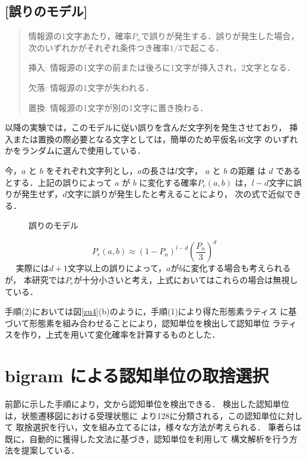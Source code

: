 \subsection*{[誤りのモデル]}
\begin{quotation}
情報源の1文字あたり，確率$P_n$で誤りが発生する．誤りが発生した場合，
次のいずれかがそれぞれ条件つき確率$1/3$で起こる．

\begin{description}
\item{\gt 挿入:} 情報源の1文字の前または後ろに1文字が挿入され，2文字となる．
\item{\gt 欠落:} 情報源の1文字が失われる．
\item{\gt 置換:} 情報源の1文字が別の1文字に置き換わる．
\end{description}

\end{quotation}

以降の実験では，このモデルに従い誤りを含んだ文字列を発生させており，
挿入または置換の際必要となる文字としては，簡単のため平仮名46文字
のいずれかをランダムに選んで使用している．


今，$a$ と $b$ をそれぞれ文字列とし，$a$の長さは$l$文字， $a$ と $b$ の距離
は $d$ であるとする．上記の誤りによって $a$ が $b$ に変化する確率$P_e(a,b)$
は，$l - d$文字に誤りが発生せず，$d$文字に誤りが発生したと考えることにより，
次の式で近似できる．

\begin{figure}
\begin{center}
\end{center}
\vspace*{-2mm}
\caption{誤りのモデル} \label{zu6}
\end{figure}
\begin{equation}
P_e(a,b) \approx (1 - P_n)^{l - d}(\frac{P_n}{3})^d 
\end{equation}
　 実際には$d+1$文字以上の誤りによって，$a$が$b$に変化する場合も考えられるが，
本研究では$P_e$が十分小さいと考え，上式においてはこれらの場合は無視している．

手順(2)においては図\ref{zu4}(b)のように，手順(1)により得た形態素ラティス
に基づいて形態素を組み合わせることにより，認知単位を検出して認知単位
ラティスを作り，上式を用いて変化確率を計算するものとした．
\vspace*{-1mm}
\section{bigram による認知単位の取捨選択}
\vspace*{-1mm}
前節に示した手順により，文から認知単位を検出できる．
検出した認知単位は，状態遷移図における受理状態に
より128に分類される，この認知単位に対して
取捨選択を行い，文を組み立てるには，様々な方法が考えられる．
筆者らは既に，自動的に獲得した文法に基づき，認知単位を利用して
構文解析を行う方法を提案している\cite{yoko0}．

